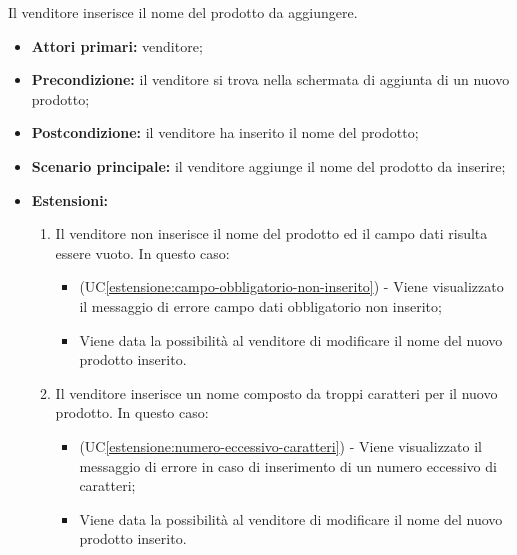Il venditore inserisce il nome del prodotto da aggiungere.
\begin{itemize}
    \item \textbf{Attori primari:} venditore;
    \item \textbf{Precondizione:} il venditore si trova nella schermata di aggiunta di un nuovo prodotto;
    \item \textbf{Postcondizione:} il venditore ha inserito il nome del prodotto;
    \item \textbf{Scenario principale:} il venditore aggiunge il nome del prodotto da inserire;
    \item \textbf{Estensioni:} 
    \begin{enumerate}[label=\lett]
    	\item Il venditore non inserisce il nome del prodotto ed il campo dati risulta essere vuoto. In questo caso:
	    \begin{itemize}
	        \item (UC\ref{estensione:campo-obbligatorio-non-inserito}) - Viene visualizzato il messaggio di errore campo dati obbligatorio non inserito;
	        \item Viene data la possibilità al venditore di modificare il nome del nuovo prodotto inserito.
	    \end{itemize}
    	\item Il venditore inserisce un nome composto da troppi caratteri per il nuovo prodotto. In questo caso:
    	\begin{itemize}
    		\item (UC\ref{estensione:numero-eccessivo-caratteri}) - Viene visualizzato il messaggio di errore in caso di inserimento di un numero eccessivo di caratteri;
    		\item Viene data la possibilità al venditore di modificare il nome del nuovo prodotto inserito.
    	\end{itemize}
	\end{enumerate}
\end{itemize}

\label{aggiunta-prodotto.descrizione}

